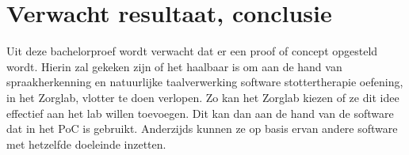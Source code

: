 %
%
%
%
%

\section{Verwacht resultaat, conclusie}%
\label{sec:verwachte_resultaten}

Uit deze bachelorproef wordt verwacht dat er een proof of concept opgesteld wordt. Hierin zal gekeken zijn of het haalbaar is om aan de hand van spraakherkenning en natuurlijke taalverwerking software stottertherapie oefening, in het Zorglab, vlotter te doen verlopen. Zo kan het Zorglab kiezen of ze dit idee effectief aan het lab willen toevoegen. Dit kan dan aan de hand van de software dat in het PoC is gebruikt. Anderzijds kunnen ze op basis ervan andere software met hetzelfde doeleinde inzetten.

